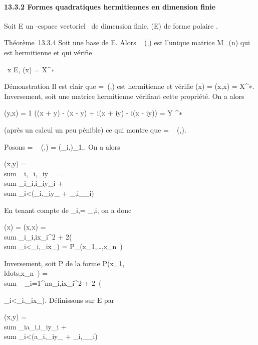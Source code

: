 \documentclass[]{article}
\begin{document}
\paragraph{13.3.2 Formes quadratiques hermitiennes en dimension finie}

Soit E un -espace vectoriel ~de dimension finie, \Phi \inQ(E) de forme
polaire \phi.

Théorème~13.3.4 Soit  une base de E. Alors
\mathrmMat~ (\phi,) est
l'unique matrice \Omega \in M\_(n) qui est hermitienne et qui vérifie

\forall~x \in E, \Phi(x) = X^∗~\OmegaX

Démonstration Il est clair que \Omega =\
\mathrmMat (\Phi,) est hermitienne et vérifie \Phi(x) =
\phi(x,x) = X^∗\OmegaX. Inversement, soit \Omega une matrice hermitienne
vérifiant cette propriété. On a alors

\phi(y,x) = 1  (\Phi(x + y) - \Phi(x - y) + i\Phi(x + iy)
- i\Phi(x - iy)) = Y ^∗\OmegaX

(après un calcul un peu pénible) ce qui montre que \Omega
= \mathrmMat~ (\phi,).

Posons \Omega = \mathrmMat~ (\phi,)
= (\omega\_i,\jmath)\_1\leqi,\jmath\leqn. On a alors

\phi(x,y) = \\sum
\_i,\jmath\omega\_i,\jmath\overlinex\_iy\_\jmath
= \\sum
\_i\omega\_i,i\overlinex\_iy\_i
+ \\sum
\_i\textless{}\jmath(\omega\_i,\jmath\overlinex\_iy\_\jmath
+ \omega\_\jmath,i\overlinex\_\jmathy\_i)

En tenant compte de \omega\_i,\jmath =
\overline\omega\_\jmath,i, on a donc

\Phi(x) = \phi(x,x) = \\sum
\_i\omega\_i,i\textbar{}x\_i\textbar{}^2 +
2\mathrmRe(\\sum
\_i\textless{}\jmath\omega\_i,\jmath\overlinex\_ix\_\jmath)
=
P\_\Phi(x\_1,\ldots,x\_n~)

Inversement, soit P de la forme
P(x\_1,\\ldots,x\_n~)
= \\sum ~
\_i=1^na\_i,i\textbar{}x\_i\textbar{}^2
+
2\mathrmRe~(\\\sum

\_i\textless{}\jmatha\_i,\jmath\overlinex\_ix\_\jmath).
Définissons \phi sur E par

\phi(x,y) = \\sum
\_ia\_i,i\overlinex\_iy\_i
+ \\sum
\_i\textless{}\jmath(a\_i,\jmath\overlinex\_iy\_\jmath
+
\overlinea\_i,\jmath\overlinex\_\jmathy\_i)
\end{document}
